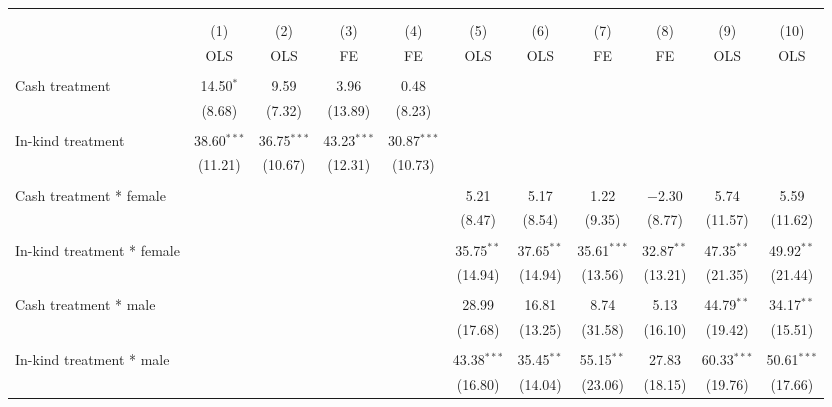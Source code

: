
\begin{table}[!htbp] \centering 
  \caption{} 
  \label{} 
\begin{tabular}{@{\extracolsep{5pt}}lcccccccccc} 
\\[-1.8ex]\hline 
\hline \\[-1.8ex] 
\\[-1.8ex] & (1) & (2) & (3) & (4) & (5) & (6) & (7) & (8) & (9) & (10)\\ 
 & OLS & OLS & FE & FE & OLS & OLS & FE & FE & OLS & OLS \\ 
\hline \\[-1.8ex] 
 Cash treatment & 14.50$^{*}$ & 9.59 & 3.96 & 0.48 &  &  &  &  &  &  \\ 
  & (8.68) & (7.32) & (13.89) & (8.23) &  &  &  &  &  &  \\ 
  & & & & & & & & & & \\ 
 In-kind treatment & 38.60$^{***}$ & 36.75$^{***}$ & 43.23$^{***}$ & 30.87$^{***}$ &  &  &  &  &  &  \\ 
  & (11.21) & (10.67) & (12.31) & (10.73) &  &  &  &  &  &  \\ 
  & & & & & & & & & & \\ 
 Cash treatment * female &  &  &  &  & 5.21 & 5.17 & 1.22 & $-$2.30 & 5.74 & 5.59 \\ 
  &  &  &  &  & (8.47) & (8.54) & (9.35) & (8.77) & (11.57) & (11.62) \\ 
  & & & & & & & & & & \\ 
 In-kind treatment * female &  &  &  &  & 35.75$^{**}$ & 37.65$^{**}$ & 35.61$^{***}$ & 32.87$^{**}$ & 47.35$^{**}$ & 49.92$^{**}$ \\ 
  &  &  &  &  & (14.94) & (14.94) & (13.56) & (13.21) & (21.35) & (21.44) \\ 
  & & & & & & & & & & \\ 
 Cash treatment * male &  &  &  &  & 28.99 & 16.81 & 8.74 & 5.13 & 44.79$^{**}$ & 34.17$^{**}$ \\ 
  &  &  &  &  & (17.68) & (13.25) & (31.58) & (16.10) & (19.42) & (15.51) \\ 
  & & & & & & & & & & \\ 
 In-kind treatment * male &  &  &  &  & 43.38$^{***}$ & 35.45$^{**}$ & 55.15$^{**}$ & 27.83 & 60.33$^{***}$ & 50.61$^{***}$ \\ 
  &  &  &  &  & (16.80) & (14.04) & (23.06) & (18.15) & (19.76) & (17.66) \\ 

\end{tabular}
\end{table}
